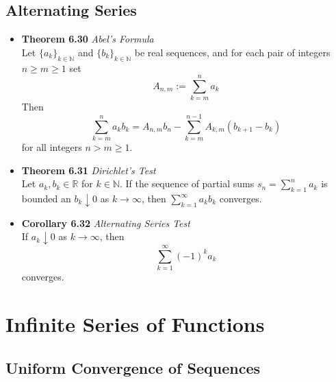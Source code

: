 \documentclass[11pt,a4paper]{article}
\begin{document}
\subsection{Alternating Series}

\begin{itemize}
    \item \textbf{Theorem 6.30} \emph{Abel's Formula} \\
        Let ${\{a_k\}}_{k \in \mathbb{N}}$ and ${\{b_k\}}_{k \in \mathbb{N}}$ be real
        sequences, and for each pair of integers $n \geq m \geq 1$ set
        \[
            A_{n, m} := \sum_{k=m}^n a_k
        \]
        Then
        \[
            \sum_{k=m}^n a_k b_k = A_{n, m} b_n - \sum_{k=m}^{n-1} A_{k, m} (b_{k+1} - b_k)
        \]
        for all integers $n > m \geq 1$.

    \item \textbf{Theorem 6.31} \emph{Dirichlet's Test} \\
        Let $a_k, b_k \in \mathbb{R}$ for $k \in \mathbb{N}$.
        If the sequence of partial sums $s_n = \sum_{k=1}^n a_k$ is bounded an
        $b_k \downarrow 0$ as $k \to \infty$, then $\sum_{k=1}^\infty a_k b_k$ converges.

    \item \textbf{Corollary 6.32} \emph{Alternating Series Test} \\
        If $a_k \downarrow 0$ as $k \to \infty$, then
        \[
            \sum_{k=1}^\infty {(-1)}^k a_k
        \]
        converges.

\end{itemize}

\break{}

\section{Infinite Series of Functions}

\subsection{Uniform Convergence of Sequences}
\end{document}
